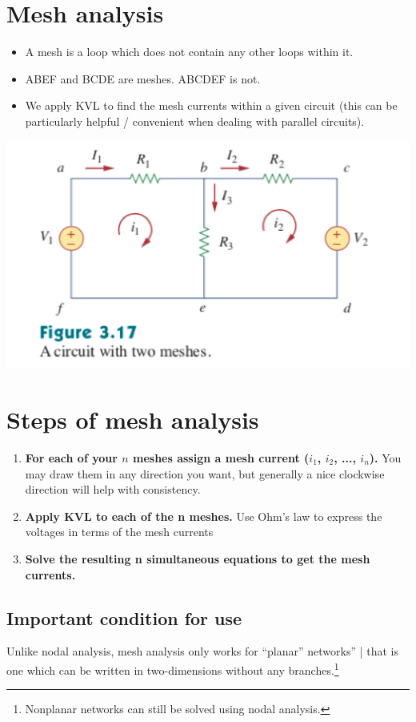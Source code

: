 \documentclass[11pt]{book}
\begin{document}
\section{Mesh analysis}
\begin{itemize}
	\item A mesh is a loop which does not contain any other loops within it.
	\item ABEF and BCDE are meshes. ABCDEF is not.
	\item We apply KVL to find the mesh currents within a given circuit (this can be particularly helpful / convenient when dealing with parallel circuits).
\end{itemize}
\begin{center}
	\includegraphics{figures/05.mesh1.png}
\end{center}

\section{Steps of mesh analysis}
\begin{enumerate}
	\item \textbf{For each of your $n$ meshes assign a mesh current ($i_1$, $i_2$, ..., $i_n$).} You may draw them in any direction you want, but generally a nice clockwise direction will help with consistency.
	\item \textbf{Apply KVL to each of the n meshes.} Use Ohm’s law to express the voltages in terms of the mesh currents
	\item \textbf{Solve the resulting n simultaneous equations to get the mesh currents.}
\end{enumerate}

\subsection{Important condition for use}
Unlike nodal analysis, mesh analysis only works for ``planar” networks'' | that is one which can be written in two-dimensions without any branches.\footnote{Nonplanar networks can still be solved using nodal analysis.}
\end{document}
